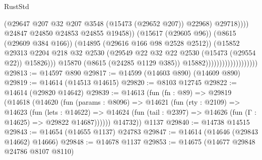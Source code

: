 \begin{lexlean}{RustStd}
\begin{coremodule}
                                                        (@29647
                                                          @207
                                                          @32
                                                          @207
                                                          @3548
                                                          (@15473 (@29652 @207))
                                                          @22968)
                                                        @29718))))
                                                @24847
                                                @24850
                                                @24853
                                                @24855
                                                @19458))
                                            (@15617 (@29605 @96))
                                            (@8615 (@29609 @384 @166))
                                            (@14895 (@29616 @166 @98 @2528 @2512))
                                            (@15852
                                              @29313
                                              @2204
                                              @218
                                              @32
                                              @2530
                                              (@29549
                                                @22
                                                @32
                                                @22
                                                @2530
                                                (@15473 (@29554 @22))
                                                @15826)))
                                          @15870
                                          (@8615 (@24285 @1129 @385))
                                          @15882)))))))))))))))))))
@29813 := @14597 @890
@29817 := @14599 (@14603 @890) (@14609 @890)
@29819 := @14614 (@14513 @14615)
@29820 := @8103 @12745
@29822 := @14614 (@29820 @14642)
@29839 := @14613
    (fun (fn : @89) =>
    @29819
      (@14618
        (@14620
          (fun (params : @8096) =>
          @14621
            (fun (rty : @2109) =>
            @14623
              (fun (lets : @14622) =>
              @14624 (fun (tail : @2397) => @14626 (fun (Γ : @14625) => @29822 @14687))))))
        @14732))
    @1137
@29840 := @14738 @14515
@29843 := @14654 (@14655 @1137) @24783
@29847 := @14614 (@14646 (@29843 @14662) @14666)
@29848 := @14678 @1137
@29853 := @14675 (@14677 @29848 @24786 @8107 @8110)

\end{coremodule}
\end{lexlean}
